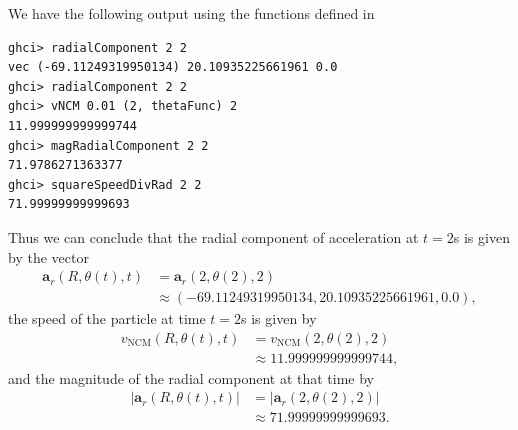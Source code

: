 We have the following output using the functions defined in

\begin{lstlisting}
ghci> radialComponent 2 2
vec (-69.11249319950134) 20.10935225661961 0.0
ghci> radialComponent 2 2
ghci> vNCM 0.01 (2, thetaFunc) 2
11.999999999999744
ghci> magRadialComponent 2 2
71.9786271363377
ghci> squareSpeedDivRad 2 2
71.99999999999693
\end{lstlisting}

Thus we can conclude that the radial component of acceleration at $t = 2$s is
given by the vector
\begin{equation*}
    \begin{split}
        \mathbf{a}_r\left(R, \theta(t), t\right) 
        &= \mathbf{a}_r\left(2, \theta(2), 2\right) \\
        &\approx (-69.11249319950134, 20.10935225661961, 0.0),
    \end{split}
\end{equation*}
the speed of the particle at time $t = 2$s is given by 
\begin{equation*}
    \begin{split}
        v_{\text{NCM}}\left(R, \theta(t), t\right)
        &= v_{\text{NCM}}\left(2, \theta(2), 2\right) \\ 
        &\approx 11.999999999999744,
    \end{split}
\end{equation*}
and the magnitude of the radial component at that time by
\begin{equation*}
    \begin{split}
        \lvert \mathbf{a}_r\left(R, \theta(t), t\right) \rvert 
        &= \lvert \mathbf{a}_r\left(2, \theta(2), 2\right) \rvert \\ 
        &\approx 71.99999999999693.
    \end{split}
\end{equation*}
